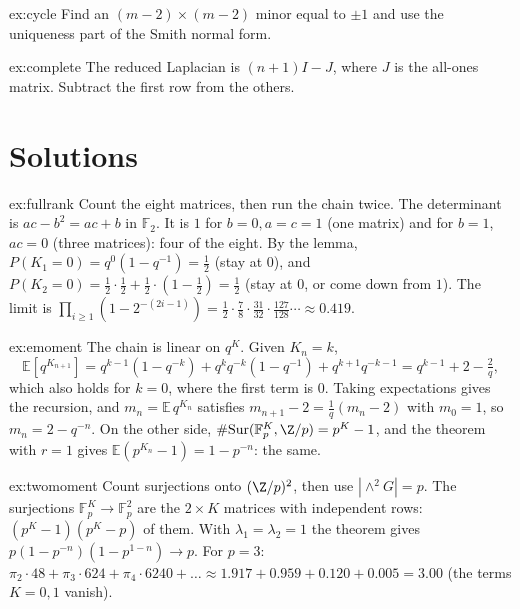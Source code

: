 \begin{hint}{ex:cycle}
Find an $(m-2)\times(m-2)$ minor equal to $\pm1$ and use the uniqueness part of the Smith normal form.
\end{hint}

\begin{hint}{ex:complete}
The reduced Laplacian is $(n+1)I-J$, where $J$ is the all-ones matrix. Subtract the first row from the others.
\end{hint}

\section{Solutions}

\begin{solution}{ex:fullrank}
\idea Count the eight matrices, then run the chain twice.
\writeup The determinant is $ac-b^2=ac+b$ in $\mathbb F_2$. It is $1$ for $b=0,a=c=1$ (one matrix) and for $b=1$, $ac=0$ (three matrices): four of the eight. By the lemma, $P(K_1=0)=q^0(1-q^{-1})=\frac12$ (stay at $0$), and $P(K_2=0)=\frac12\cdot\frac12+\frac12\cdot(1-\frac12)=\frac12$ (stay at $0$, or come down from $1$). The limit is $\prod_{i\ge1}(1-2^{-(2i-1)})=\frac12\cdot\frac78\cdot\frac{31}{32}\cdot\frac{127}{128}\cdots\approx0.419$.
\end{solution}

\begin{solution}{ex:emoment}
\idea The chain is linear on $q^K$.
\writeup Given $K_n=k$,
\[
\mathbb E[q^{K_{n+1}}]=q^{k-1}(1-q^{-k})+q^kq^{-k}(1-q^{-1})+q^{k+1}q^{-k-1}=q^{k-1}+2-\tfrac2q,
\]
which also holds for $k=0$, where the first term is $0$. Taking expectations gives the recursion, and $m_n=\mathbb E\,q^{K_n}$ satisfies $m_{n+1}-2=\frac1q(m_n-2)$ with $m_0=1$, so $m_n=2-q^{-n}$. On the other side, $\#\mathrm{Sur}(\mathbb F_p^K,\Z/p)=p^K-1$, and the theorem with $r=1$ gives $\mathbb E(p^{K_n}-1)=1-p^{-n}$: the same.
\end{solution}

\begin{solution}{ex:twomoment}
\idea Count surjections onto $(\Z/p)^2$, then use $|\wedge^2G|=p$.
\writeup The surjections $\mathbb F_p^K\to\mathbb F_p^2$ are the $2\times K$ matrices with independent rows: $(p^K-1)(p^K-p)$ of them. With $\lambda_1=\lambda_2=1$ the theorem gives $p(1-p^{-n})(1-p^{1-n})\to p$. For $p=3$: $\pi_2\cdot48+\pi_3\cdot624+\pi_4\cdot6240+\dots\approx1.917+0.959+0.120+0.005=3.00$ (the terms $K=0,1$ vanish).
\end{solution}

